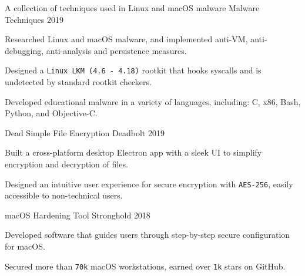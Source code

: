 
\begin{cventries}
\cventry
{A collection of techniques used in Linux and macOS malware} %
{Malware Techniques} %
{2019} %
{} %
{
	\begin{cvitems} %
		\item {Researched Linux and macOS malware, and implemented anti-VM, anti-debugging, anti-analysis and persistence measures.}
		\item {Designed a \texttt{Linux LKM (4.6 - 4.18)} rootkit that hooks syscalls and is undetected by standard rootkit checkers.}
		\item {Developed educational malware in a variety of languages, including: C, x86, Bash, Python, and Objective-C.}
	\end{cvitems}
}

\cventry
{Dead Simple File Encryption} %
{Deadbolt} %
{2019} %
{} %
{
	\begin{cvitems} %
		\item {Built a cross-platform desktop Electron app with a sleek UI to simplify encryption and decryption of files.}
		\item {Designed an intuitive user experience for secure encryption with \texttt{AES-256}, easily accessible to non-technical users.}
	\end{cvitems}
}

\cventry
{macOS Hardening Tool} %
{Stronghold} %
{2018} %
{} %
{
	\begin{cvitems} %
		\item {Developed software that guides users through step-by-step secure configuration for macOS.}
		\item {Secured more than \texttt{70k} macOS workstations, earned over \texttt{1k} stars on GitHub.}
	\end{cvitems}
}


\end{cventries}
